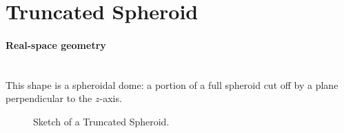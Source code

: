 

\newpage
\section{Truncated Spheroid} 

\paragraph{Real-space geometry}\mbox{}\\
This shape is a spheroidal dome: a portion of a full spheroid cut off
by a plane perpendicular to the $z$-axis.

\begin{figure}[ht]
\hfill
{}
\hfill
{}
\hfill
\caption{Sketch of a Truncated Spheroid.}
\label{fig:spheroid}
\end{figure}


